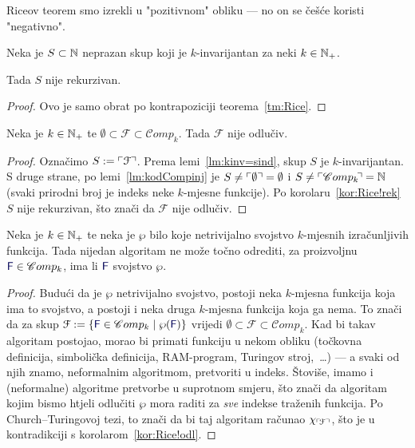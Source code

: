 Riceov teorem smo izrekli u "pozitivnom" obliku --- no on se češće koristi "negativno".

\begin{korolar}[{name=[nerekurzivnost netrivijalnog $k$-invarijantnog skupa brojeva]}]\label{kor:Rice!rek}
Neka je $S\subset{\mathbb N}$ neprazan skup koji je $k$-invarijantan za neki $k\in{\mathbb N}_+$.
	
	Tada $S$ nije rekurzivan.
\end{korolar}
\begin{proof}
Ovo je samo obrat po kontrapoziciji teorema~\ref{tm:Rice}.
\end{proof}

\begin{korolar}[{name=[neodlučivost netrivijalnog skupa izračunljivih funkcija]}]\label{kor:Rice!odl}
Neka je $k\in{\mathbb N}_+$ te $\emptyset\subset\mathcal F\subset\mathscr Comp_k$. Tada $\mathcal F$ nije odlučiv\!.
\end{korolar}
\begin{proof}
    Označimo $S:=\ulcorner\mathcal F\urcorner$. Prema lemi~\ref{lm:kinv=sind}, skup $S$ je $k$-invarijantan. S druge strane, po lemi~\ref{lm:kodCompinj} je $S\ne\ulcorner\emptyset\urcorner=\emptyset$ i $S\ne\ulcorner\mathscr Comp_k\!\urcorner={\mathbb N}$ (svaki prirodni broj je indeks neke $k$-mjesne funkcije). Po korolaru~\ref{kor:Rice!rek} $S$ nije rekurzivan, što znači da $\mathcal F$ nije odlučiv\!.
\end{proof}

\begin{korolar}[{name=[neodlučivost netrivijalnih semantičkih svojstava]}]
Neka je $k\in{\mathbb N}_+$ te neka je $\wp$ bilo koje netrivijalno svojstvo $k$-mjesnih izračunljivih funkcija. Tada nijedan algoritam ne može točno odrediti, za proizvoljnu $\f F\in\mathscr Comp_k$, ima li $\f F$ svojstvo $\wp$.
\end{korolar}
\begin{proof}
Budući da je $\wp$ netrivijalno svojstvo, postoji neka $k$-mjesna funkcija koja ima to svojstvo, a postoji i neka druga $k$-mjesna funkcija koja ga nema. To znači da za skup $\mathcal F:=\{\f F\in\mathscr Comp_k\mid\wp(\f F)\}$ vrijedi $\emptyset\subset\mathcal F\subset\mathscr Comp_k$. Kad bi takav algoritam postojao, morao bi primati funkciju u nekom obliku (točkovna definicija, simbolička definicija, RAM-program, Turingov stroj,~\ldots) --- a svaki od njih znamo, neformalnim algoritmom, pretvoriti u indeks. Štoviše, imamo i (neformalne) algoritme pretvorbe u suprotnom smjeru, što znači da algoritam kojim bismo htjeli odlučiti $\wp$ mora raditi za \emph{sve} indekse traženih funkcija.
Po Church--\!Turingovoj tezi, to znači da bi taj algoritam računao $\chi_{\ulcorner\!\mathcal F\urcorner}$, što je u kontradikciji s korolarom~\ref{kor:Rice!odl}.
\end{proof}

